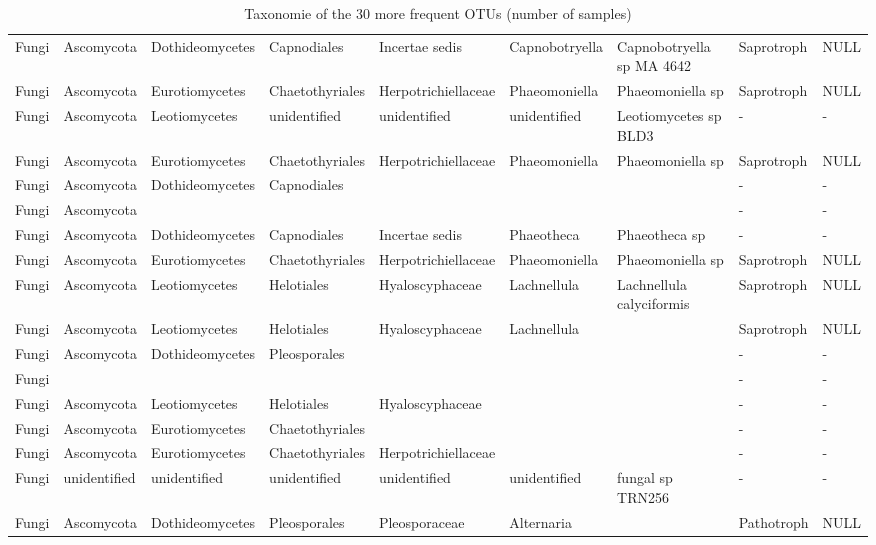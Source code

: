 \documentclass[12pt]{article}\usepackage[]{graphicx}\usepackage[]{color}
\numberwithin{figure}{section}
\begin{document}
\begin{landscape}
\begin{table}[ht]
\begin{tabular}{lllllllll}
  Fungi & Ascomycota & Dothideomycetes & Capnodiales & Incertae sedis & Capnobotryella & Capnobotryella sp MA 4642 & Saprotroph & NULL \\ 
  Fungi & Ascomycota & Eurotiomycetes & Chaetothyriales & Herpotrichiellaceae & Phaeomoniella & Phaeomoniella sp & Saprotroph & NULL \\ 
  Fungi & Ascomycota & Leotiomycetes & unidentified & unidentified & unidentified & Leotiomycetes sp BLD3 & - & - \\ 
  Fungi & Ascomycota & Eurotiomycetes & Chaetothyriales & Herpotrichiellaceae & Phaeomoniella & Phaeomoniella sp & Saprotroph & NULL \\ 
  Fungi & Ascomycota & Dothideomycetes & Capnodiales &  &  &  & - & - \\ 
  Fungi & Ascomycota &  &  &  &  &  & - & - \\ 
  Fungi & Ascomycota & Dothideomycetes & Capnodiales & Incertae sedis & Phaeotheca & Phaeotheca sp & - & - \\ 
  Fungi & Ascomycota & Eurotiomycetes & Chaetothyriales & Herpotrichiellaceae & Phaeomoniella & Phaeomoniella sp & Saprotroph & NULL \\ 
  Fungi & Ascomycota & Leotiomycetes & Helotiales & Hyaloscyphaceae & Lachnellula & Lachnellula calyciformis & Saprotroph & NULL \\ 
  Fungi & Ascomycota & Leotiomycetes & Helotiales & Hyaloscyphaceae & Lachnellula &  & Saprotroph & NULL \\ 
  Fungi & Ascomycota & Dothideomycetes & Pleosporales &  &  &  & - & - \\ 
  Fungi &  &  &  &  &  &  & - & - \\ 
  Fungi & Ascomycota & Leotiomycetes & Helotiales & Hyaloscyphaceae &  &  & - & - \\ 
  Fungi & Ascomycota & Eurotiomycetes & Chaetothyriales &  &  &  & - & - \\ 
  Fungi & Ascomycota & Eurotiomycetes & Chaetothyriales & Herpotrichiellaceae &  &  & - & - \\ 
  Fungi & unidentified & unidentified & unidentified & unidentified & unidentified & fungal sp TRN256 & - & - \\ 
  Fungi & Ascomycota & Dothideomycetes & Pleosporales & Pleosporaceae & Alternaria &  & Pathotroph & NULL \\ 
   \hline
\end{tabular}
\endgroup
\caption{Taxonomie of the 30 more frequent OTUs (number of samples)} 
\end{table}

\end{landscape}
\end{document}
